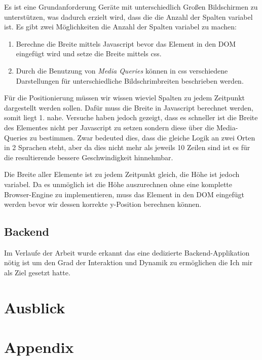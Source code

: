 \documentclass[12pt,twoside]{book}
\let\cleardoublepage\clearpage
\begin{document}
Es ist eine Grundanforderung Geräte mit unterschiedlich Großen Bildschirmen zu unterstützen, was dadurch erzielt wird, dass die die Anzahl der Spalten variabel ist.
Es gibt zwei Möglichkeiten die Anzahl der Spalten variabel zu machen:

\begin{enumerate}
  \item Berechne die Breite mittels Javascript bevor das Element in den DOM eingefügt wird und setze die Breite mittels css.
  \item Durch die Benutzung von \textit{Media Queries} können in css verschiedene Darstellungen für unterschiedliche Bildschrimbreiten beschrieben werden.
\end{enumerate}

Für die Positionierung müssen wir wissen wieviel Spalten zu jedem Zeitpunkt dargestellt werden sollen. Dafür muss die Breite in Javascript berechnet werden, somit liegt 1. nahe. Versuche haben jedoch gezeigt, dass es schneller ist die Breite des Elementes nicht per Javascript zu setzen sondern diese über die Media-Queries zu bestimmen. Zwar bedeuted dies, dass die gleiche Logik an zwei Orten in 2 Sprachen steht, aber da dies nicht mehr als jeweils 10 Zeilen sind ist es für die resultierende bessere Geschwindigkeit hinnehmbar.

Die Breite aller Elemente ist zu jedem Zeitpunkt gleich, die Höhe ist jedoch variabel. Da es unmöglich ist die Höhe auszurechnen ohne eine komplette Browser-Engine zu implementieren, muss das Element in den DOM eingefügt werden bevor wir dessen korrekte y-Position berechnen können.


\section*{Backend}

Im Verlaufe der Arbeit wurde erkannt das eine dedizierte Backend-Applikation nötig ist um den Grad der Interaktion und Dynamik zu ermöglichen die Ich mir als Ziel gesetzt hatte.

\chapter{Ausblick}

\chapter{Appendix}

\cleardoublepage
{}

\printbibliography

\cleardoublepage
{}
\end{document}
